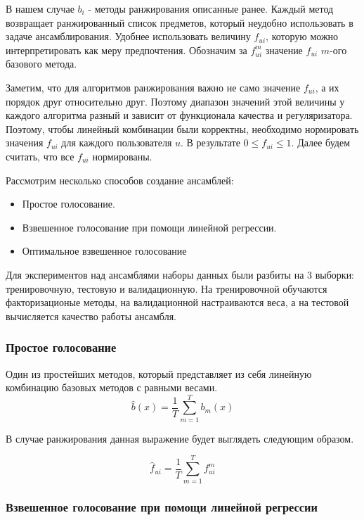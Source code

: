 \documentclass[14pt]{extarticle}
\begin{document}
В нашем случае $b_i$ - методы ранжирования описанные ранее. Каждый метод возвращает ранжированный список предметов, который неудобно использовать в задаче ансамблирования. Удобнее использовать величину $f_{ui}$, которую можно интерпретировать как меру предпочтения. Обозначим  за $f_{ui}^m$ значение $f_{ui}$ $m$-ого базового метода.

Заметим, что для алгоритмов ранжирования  важно не само значение $f_{ui}$, а их порядок друг относительно друг. Поэтому диапазон значений этой величины у каждого алгоритма разный и зависит от функционала качества и регуляризатора. Поэтому, чтобы линейный комбинации были корректны,  необходимо нормировать значения $f_{ui}$ для каждого пользователя $u$. В результате $0 \leq f_{ui} \leq 1$. Далее будем считать, что все $f_{ui}$ нормированы.

  Рассмотрим несколько способов создание ансамблей:
 
\begin{itemize}
\item Простое голосование. 
\item Взвешенное голосование при помощи линейной регрессии.
\item Оптимальное взвешенное голосование
\end{itemize}
Для экспериментов над ансамблями наборы данных были разбиты на 3 выборки: тренировочную, тестовую и валидационную. На тренировочной обучаются факторизационые методы, на валидационной настраиваются веса, а на тестовой вычисляется качество работы ансамбля. 

\subsubsection*{Простое голосование}
Один из простейших методов, который представляет из себя линейную комбинацию базовых методов с равными весами.
\begin{equation*}
 	\hat{b}(x)= \frac{1}{T}\sum_{m = 1} ^ T b_m(x)
\end{equation*}

В случае ранжирования данная выражение будет выглядеть следующим образом.

\begin{equation*}
	\hat{f}_{ui} = \frac{1}{T}\sum_{m = 1} ^ T f_{ui}^m
\end{equation*}
\subsubsection*{Взвешенное голосование при помощи линейной регрессии}
\end{document}
